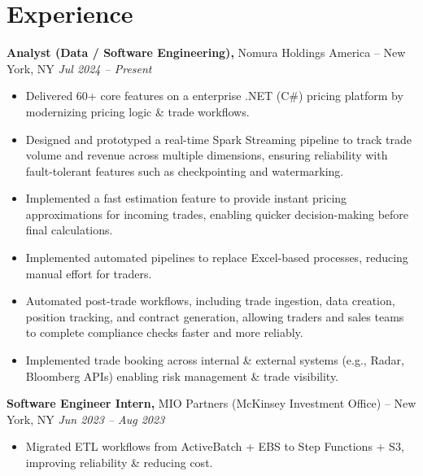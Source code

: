 \documentclass[10pt]{article}
\begin{document}
\section*{Experience}
\textbf{Analyst (Data / Software Engineering),} Nomura Holdings America -- New York, NY \hfill \textit{Jul 2024 -- Present} \\
\vspace{0pt}
\begin{itemize}
  \item Delivered 60+ core features on a enterprise .NET (C\#) pricing platform by modernizing pricing logic \& trade workflows.
  \item Designed and prototyped a real-time Spark Streaming pipeline to track trade volume and revenue across multiple dimensions, ensuring reliability with fault-tolerant features such as checkpointing and watermarking.
  \item Implemented a fast estimation feature to provide instant pricing approximations for incoming trades, enabling quicker decision-making before final calculations.
  \item Implemented automated pipelines to replace Excel-based processes, reducing manual effort for traders.
  \item Automated post-trade workflows, including trade ingestion, data creation, position tracking, and contract generation, allowing traders and sales teams to complete compliance checks faster and more reliably.
  \item Implemented trade booking across internal \& external systems (e.g., Radar, Bloomberg APIs) enabling risk management \& trade visibility.
\end{itemize}

\textbf{Software Engineer Intern,} MIO Partners (McKinsey Investment Office) -- New York, NY \hfill \textit{Jun 2023 -- Aug 2023} \\
\vspace{0pt}
\begin{itemize}
  \item Migrated ETL workflows from ActiveBatch + EBS to Step Functions + S3, improving reliability \& reducing cost.
\end{itemize}
\end{document}
